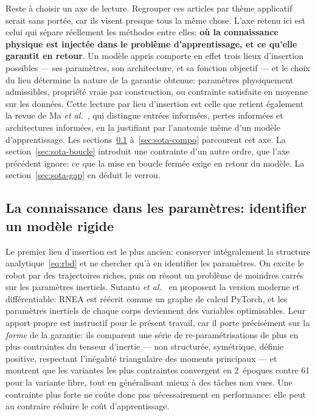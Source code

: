 \documentclass[a4paper, oneside]{article}
\begin{document}
Reste à choisir un axe de lecture. Regrouper ces articles par thème applicatif
serait sans portée, car ils visent presque tous la même chose. L'axe retenu ici
est celui qui sépare réellement les méthodes entre elles: \textbf{où la
connaissance physique est injectée dans le problème d'apprentissage, et ce
qu'elle garantit en retour}. Un modèle appris comporte en effet trois lieux
d'insertion possibles — ses paramètres, son architecture, et sa fonction
objectif — et le choix du lieu détermine la nature de la garantie obtenue:
paramètres physiquement admissibles, propriété vraie par construction, ou
contrainte satisfaite en moyenne sur les données. Cette lecture par lieu
d'insertion est celle que retient également la revue de
Ma \emph{et al.}~\cite{ma2025}, qui distingue entrées informées, pertes
informées et architectures informées, en la justifiant par l'anatomie même d'un
modèle d'apprentissage. Les sections~\ref{sec:sota-param}
à~\ref{sec:sota-compo} parcourent cet axe. La
section~\ref{sec:sota-boucle} introduit une contrainte d'un autre ordre, que
l'axe précédent ignore: ce que la mise en boucle fermée exige en retour du
modèle. La section~\ref{sec:sota-gap} en déduit le verrou.

\subsection{La connaissance dans les paramètres: identifier un modèle rigide}
\label{sec:sota-param}

Le premier lieu d'insertion est le plus ancien: conserver intégralement la
structure analytique~\eqref{eq:rbd} et ne chercher qu'à en identifier les
paramètres. On excite le robot par des trajectoires riches, puis on résout un
problème de moindres carrés sur les paramètres inertiels.
Sutanto \emph{et al.}~\cite{sutanto2020} en proposent la version moderne et
différentiable: RNEA est réécrit comme un graphe de calcul PyTorch, et les
paramètres inertiels de chaque corps deviennent des variables optimisables.
Leur apport propre est instructif pour le présent travail, car il porte
précisément sur la \emph{forme} de la garantie: ils comparent une série de
re-paramétrisations de plus en plus contraintes du tenseur d'inertie — non
structurée, symétrique, définie positive, respectant l'inégalité triangulaire
des moments principaux — et montrent que les variantes les plus contraintes
convergent en 2~époques contre 61 pour la variante libre, tout en généralisant
mieux à des tâches non vues. Une contrainte plus forte ne coûte donc pas
nécessairement en performance: elle peut au contraire réduire le coût
d'apprentissage.
\end{document}
